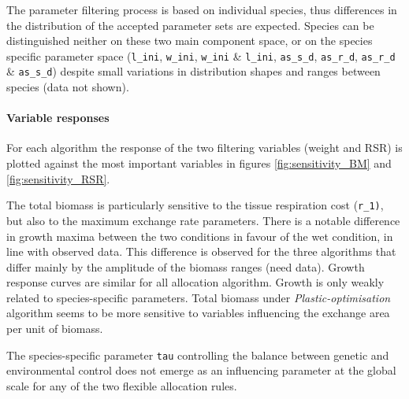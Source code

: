 The parameter filtering process is based on individual species, thus differences in the distribution of the accepted parameter sets are expected. Species can be distinguished neither on these two main component space, or on the species specific parameter space (\texttt{l\_ini}, \texttt{w\_ini}, \texttt{w\_ini} \& \texttt{l\_ini}, \texttt{as\_s\_d}, \texttt{as\_r\_d}, \texttt{as\_r\_d} \& \texttt{as\_s\_d}) despite small variations in distribution shapes and ranges between species (data not shown).\\

\paragraph{Variable responses}
For each algorithm the response of the two filtering variables (weight and RSR) is plotted against the most important variables in figures \ref{fig:sensitivity_BM} and \ref{fig:sensitivity_RSR}.

The total biomass is particularly sensitive to the tissue respiration cost (\texttt{r\_1)}, but also to the maximum exchange rate parameters. There is a notable difference in growth maxima between the two conditions in favour of the wet condition, in line with observed data. This difference is observed for the three algorithms that differ mainly by the amplitude of the biomass ranges (need data). Growth response curves are similar for all allocation algorithm. Growth is only weakly related to species-specific parameters. Total biomass under \textit{Plastic-optimisation} algorithm seems to be more sensitive to variables influencing the exchange area per unit of biomass.

The species-specific parameter \texttt{tau} controlling the balance between genetic and environmental control does not emerge as an influencing parameter at the global scale for any of the two flexible allocation rules.


